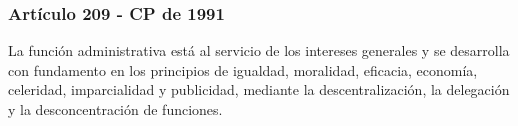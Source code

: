 

\begin{frame}
  \frametitle{Art\'iculo 209 - CP de 1991}
  La funci\'on administrativa est\'a al servicio de los intereses generales y se desarrolla con fundamento en los principios de igualdad, moralidad, eficacia, econom\'ia, celeridad, imparcialidad y publicidad, mediante la descentralizaci\'on, la delegaci\'on y la desconcentraci\'on de funciones.
\end{frame}

